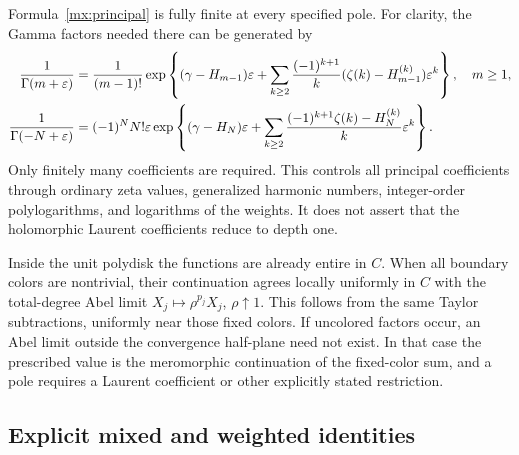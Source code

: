 Formula~\eqref{mx:principal} is fully finite at every specified pole.
For clarity, the Gamma factors needed there can be generated by
\begin{align}\label{mx:gammajets}
 \frac1{\Gamma(m+\varepsilon)}
 &=\frac1{(m-1)!}\exp\left\{
   (\gamma-H_{m-1})\varepsilon+
   \sum_{k\geq2}\frac{(-1)^{k+1}}k
       (\zeta(k)-H_{m-1}^{(k)})\varepsilon^k\right\},\quad m\geq1,
 \notag\\
 \frac1{\Gamma(-N+\varepsilon)}
 &=(-1)^NN!\varepsilon\exp\left\{
   (\gamma-H_N)\varepsilon+
   \sum_{k\geq2}\frac{(-1)^{k+1}\zeta(k)-H_N^{(k)}}k
                                        \varepsilon^k\right\}.
\end{align}
Only finitely many coefficients are required.  This controls all
principal coefficients through ordinary zeta values, generalized
harmonic numbers, integer-order polylogarithms, and logarithms of
the weights.  It does not assert that the holomorphic Laurent
coefficients reduce to depth one.

Inside the unit polydisk the functions are already entire in $C$.
When all boundary colors are nontrivial, their continuation agrees
locally uniformly in $C$ with the total-degree Abel limit
$X_j\mapsto\rho^{p_j}X_j$, $\rho\uparrow1$.  This follows from
the same Taylor subtractions, uniformly near those fixed colors.
If uncolored factors occur, an Abel limit outside the convergence
half-plane need not exist.  In that case the prescribed value is the
meromorphic continuation of the fixed-color sum, and a pole requires
a Laurent coefficient or other explicitly stated restriction.

\subsection{Explicit mixed and weighted identities}


